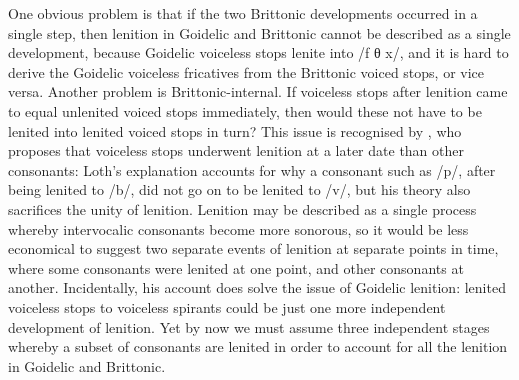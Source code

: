 One obvious problem is that if the two Brittonic developments occurred in a single step, then lenition in Goidelic and Brittonic cannot be described as a single development, because Goidelic voiceless stops lenite into /f θ x/, and it is hard to derive the Goidelic  voiceless fricatives from the Brittonic voiced stops, or vice versa. Another problem is Brittonic-internal. If voiceless stops after lenition came to equal unlenited voiced stops immediately, then would these not have to be lenited into lenited voiced stops in turn? This issue is recognised  by \textcite{loth_les_1892}, who proposes that voiceless stops underwent lenition at a later date than other consonants:
Loth's explanation accounts for why a consonant such as /p/, after being lenited to /b/, did not go on to be lenited to /v/, but his theory also sacrifices the unity of lenition. Lenition may be described as a single process whereby intervocalic consonants become more sonorous, so it would be less economical to suggest two separate events of lenition at separate points in time, where some consonants were lenited at one point, and other consonants at another. Incidentally, his account does solve the issue of Goidelic lenition:  lenited voiceless stops to voiceless spirants could be just one more independent development of lenition. Yet by now we must assume three independent stages whereby a subset of consonants are lenited in order to account for all the lenition in Goidelic and Brittonic.

